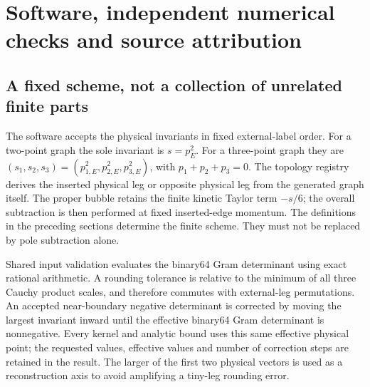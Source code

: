 \section{Software, independent numerical checks and source attribution}
\subsection{A fixed scheme, not a collection of unrelated finite parts}
The software accepts the physical invariants in fixed external-label order.
For a two-point graph the sole invariant is $s=p_E^2$. For a three-point
graph they are $(s_1,s_2,s_3)=(p_{1,E}^2,p_{2,E}^2,p_{3,E}^2)$, with
$p_1+p_2+p_3=0$. The topology registry derives the inserted physical leg or
opposite physical leg from the generated graph itself.
The proper bubble retains the finite kinetic Taylor term $-s/6$; the
overall subtraction is then performed at fixed inserted-edge momentum.
The definitions in the preceding sections determine the finite scheme.
They must not be replaced by pole subtraction alone.

Shared input validation evaluates the binary64 Gram determinant using exact
rational arithmetic. A rounding tolerance is relative to the minimum of all
three Cauchy product scales, and therefore commutes with external-leg
permutations. An accepted near-boundary negative determinant is corrected by
moving the largest invariant inward until the effective binary64 Gram
determinant is nonnegative. Every kernel and analytic bound uses this same
effective physical point; the requested values, effective values and number
of correction steps are retained in the result. The larger of the first two
physical vectors is used as a reconstruction axis to avoid amplifying a
tiny-leg rounding error.

